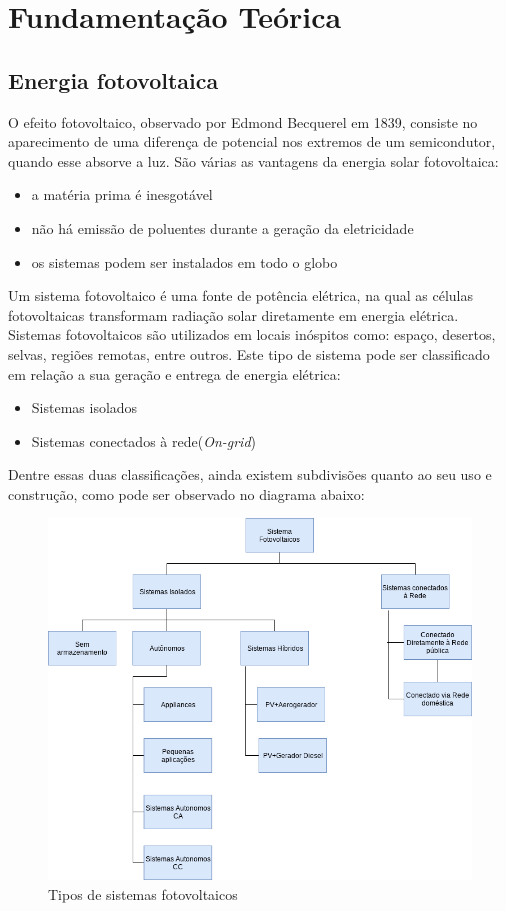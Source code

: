 \chapter{Fundamentação Teórica}
\label{cap:funcamentacao:teorica}
\section{Energia fotovoltaica}
O efeito fotovoltaico, observado por Edmond Becquerel em 1839, consiste no aparecimento de uma diferença de potencial nos extremos de um semicondutor, quando esse absorve  a luz.\cite{} São várias as vantagens da energia solar fotovoltaica:
\begin{itemize}
\item a matéria prima é inesgotável
\item não há emissão de poluentes durante a geração da eletricidade
\item os sistemas podem ser instalados em todo o globo
\end{itemize}


Um sistema fotovoltaico é uma fonte de potência elétrica, na qual as células fotovoltaicas transformam radiação solar diretamente em energia elétrica. Sistemas fotovoltaicos são utilizados em locais inóspitos como: espaço, desertos, selvas, regiões remotas, entre outros. Este tipo de sistema pode ser classificado em relação a sua geração e entrega de energia elétrica:
\begin{itemize}
\item Sistemas isolados
\item Sistemas conectados à rede(\textit{On-grid})
\end{itemize}

Dentre essas duas classificações, ainda existem subdivisões quanto ao seu uso e construção, como pode ser observado no diagrama abaixo: 
\begin{figure}[H]
    \centering
    \includegraphics[width=1.0\textwidth]{figuras/sistemasFoto.png}
    \caption{Tipos de sistemas fotovoltaicos}
    \label{fig:caminho-objetos-scheduling}
\end{figure}


